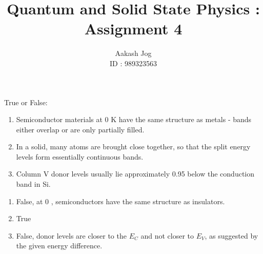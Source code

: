 \documentclass[fleqn, a4paper, 11pt, oneside]{amsart}
\title{Quantum and Solid State Physics : Assignment 4}
\author
{
	Aakash Jog\\
	ID : 989323563
}
\date{\formatdate{12}{11}{2015}}
\theoremstyle{definition}
\theoremstyle{theorem}
\begin{document}

\maketitle

\begin{question}
	True or False:
	\begin{enumerate}
		\item Semiconductor materials at 0 \si{\kelvin} have the same structure as metals - bands either overlap or are only partially filled.
		\item In a solid, many atoms are brought close together, so that the split energy levels form essentially continuous bands.
		\item Column $\mathrm{V}$ donor levels usually lie approximately 0.95 \electronvolt below the conduction band in Si.
	\end{enumerate}
\end{question}

\begin{solution}
	\begin{enumerate}[leftmargin=*]
		\item
			False, at 0 \kelvin, semiconductors have the same structure as insulators.
		\item
			True
		\item
			False, donor levels are closer to the $E_C$ and not closer to $E_V$, as suggested by the given energy difference.
	\end{enumerate}
\end{solution}
\end{document}
